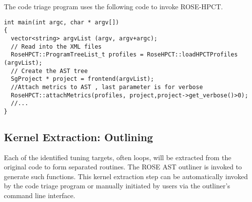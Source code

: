 The code triage program uses the following code to invoke ROSE-HPCT.

{\mySmallFontSize
\begin{verbatim}
int main(int argc, char * argv[]) 
{
  vector<string> argvList (argv, argv+argc);
  // Read into the XML files
  RoseHPCT::ProgramTreeList_t profiles = RoseHPCT::loadHPCTProfiles (argvList);
  // Create the AST tree
  SgProject * project = frontend(argvList);
  //Attach metrics to AST , last parameter is for verbose
  RoseHPCT::attachMetrics(profiles, project,project->get_verbose()>0);
  //...
}
\end{verbatim}
}

%
%
%
%

\subsection{Kernel Extraction: Outlining}
Each of the identified tuning targets, often loops, will be extracted from the original code to
form separated  routines. 
The ROSE AST outliner is invoked to generate such functions. 
This kernel extraction step can be automatically invoked by the code triage
program or manually initiated by users via the outliner's command line
interface. 


